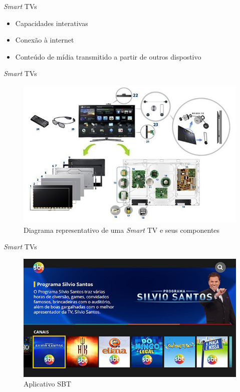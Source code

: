 \begin{frame}{\emph{Smart} TVs}
   \ \  \\[0.1cm]
  \begin{itemize}
  \item Capacidades interativas
  \item Conexão à internet
  \item Conteúdo de mídia transmitido a partir de outros dispostivo
\end{itemize}
\end{frame}

\begin{frame}{\emph{Smart} TVs}
\begin{figure}[h!]
	\includegraphics[width=\textwidth]{img/smart_samsung.jpg}
	\caption{Diagrama representativo de uma \emph{Smart} TV e seus componentes}
	\label{fig:smart_samsung}
\end{figure}
\end{frame}


\begin{frame}{\emph{Smart} TVs}
  \begin{figure}[h!]
  	\centering
  	\includegraphics[width=\textwidth]{img/sbt_app.jpg}
  	\caption{Aplicativo SBT}
  	\label{fig:sbt_app}
  \end{figure}
\end{frame}

